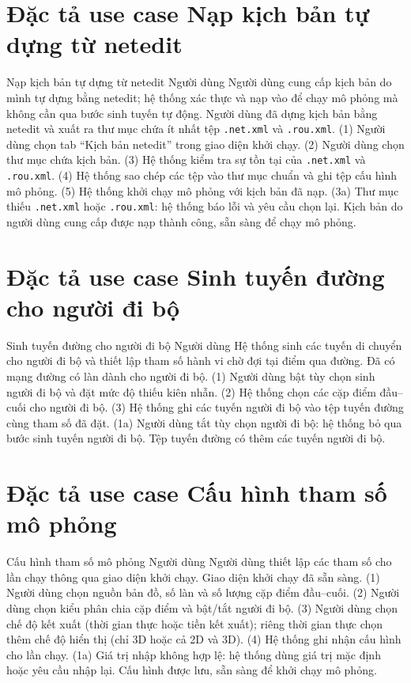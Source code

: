 \documentclass[../DoAn.tex]{subfiles}
\begin{document}
\section{Đặc tả use case Nạp kịch bản tự dựng từ netedit}

\uctable
    {Nạp kịch bản tự dựng từ netedit}
    {Người dùng}
    {Người dùng cung cấp kịch bản do mình tự dựng bằng netedit; hệ thống xác thực và nạp vào để chạy mô phỏng mà không cần qua bước sinh tuyến tự động.}
    {Người dùng đã dựng kịch bản bằng netedit và xuất ra thư mục chứa ít nhất tệp \texttt{.net.xml} và \texttt{.rou.xml}.}
    {(1) Người dùng chọn tab ``Kịch bản netedit'' trong giao diện khởi chạy. (2) Người dùng chọn thư mục chứa kịch bản. (3) Hệ thống kiểm tra sự tồn tại của \texttt{.net.xml} và \texttt{.rou.xml}. (4) Hệ thống sao chép các tệp vào thư mục chuẩn và ghi tệp cấu hình mô phỏng. (5) Hệ thống khởi chạy mô phỏng với kịch bản đã nạp.}
    {(3a) Thư mục thiếu \texttt{.net.xml} hoặc \texttt{.rou.xml}: hệ thống báo lỗi và yêu cầu chọn lại.}
    {Kịch bản do người dùng cung cấp được nạp thành công, sẵn sàng để chạy mô phỏng.}

\section{Đặc tả use case Sinh tuyến đường cho người đi bộ}

\uctable
    {Sinh tuyến đường cho người đi bộ}
    {Người dùng}
    {Hệ thống sinh các tuyến di chuyển cho người đi bộ và thiết lập tham số hành vi chờ đợi tại điểm qua đường.}
    {Đã có mạng đường có làn dành cho người đi bộ.}
    {(1) Người dùng bật tùy chọn sinh người đi bộ và đặt mức độ thiếu kiên nhẫn. (2) Hệ thống chọn các cặp điểm đầu--cuối cho người đi bộ. (3) Hệ thống ghi các tuyến người đi bộ vào tệp tuyến đường cùng tham số đã đặt.}
    {(1a) Người dùng tắt tùy chọn người đi bộ: hệ thống bỏ qua bước sinh tuyến người đi bộ.}
    {Tệp tuyến đường có thêm các tuyến người đi bộ.}

\section{Đặc tả use case Cấu hình tham số mô phỏng}

\uctable
    {Cấu hình tham số mô phỏng}
    {Người dùng}
    {Người dùng thiết lập các tham số cho lần chạy thông qua giao diện khởi chạy.}
    {Giao diện khởi chạy đã sẵn sàng.}
    {(1) Người dùng chọn nguồn bản đồ, số làn và số lượng cặp điểm đầu--cuối. (2) Người dùng chọn kiểu phân chia cặp điểm và bật/tắt người đi bộ. (3) Người dùng chọn chế độ kết xuất (thời gian thực hoặc tiền kết xuất); riêng thời gian thực chọn thêm chế độ hiển thị (chỉ 3D hoặc cả 2D và 3D). (4) Hệ thống ghi nhận cấu hình cho lần chạy.}
    {(1a) Giá trị nhập không hợp lệ: hệ thống dùng giá trị mặc định hoặc yêu cầu nhập lại.}
    {Cấu hình được lưu, sẵn sàng để khởi chạy mô phỏng.}
\end{document}
